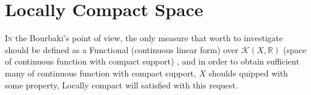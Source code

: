 \documentclass[lang=cn, class=book]{ztex}
\begin{document}
\chapter{Locally Compact Space}
\thispagestyle{plain}
\lettrine{I}{n} the Bourbaki's point of view, the only measure that worth to investigate should be 
defined as a Functional (continuous linear form) over $\mathscr{K}(X, \mathbb{R})$ (space of 
continuous function with compact support) , and in order to obtain sufficient many of continuous 
function with compact support, $X$ shoulde quipped with some property, Locally compact 
will satisfied with this request. 
\end{document}
